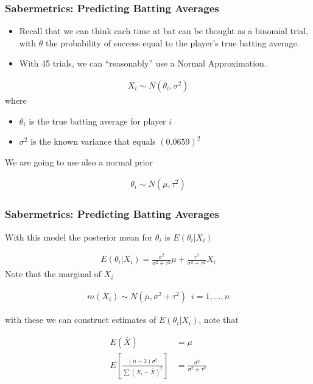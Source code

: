 \documentclass[
  shownotes,
  xcolor={svgnames},
  hyperref={colorlinks,citecolor=DarkBlue,linkcolor=DarkRed,urlcolor=DarkBlue}
  ]{beamer}
\begin{document}
\begin{frame}[fragile]
\frametitle{Sabermetrics: Predicting Batting Averages}

\begin{itemize}
\item Recall that we can think each time at bat can be thought as a binomial trial, with $\theta$ the probability of success equal to the player's true batting average.
\item With 45 trials, we can ``reasonably'' use a Normal Approximation.
\end{itemize}

\begin{align}
  X_i \sim N(\theta_i,\sigma^2)
\end{align}
where

\begin{itemize}
  \item $\theta_i$ is the true batting average for player $i$
  \item $\sigma^2$ is the known variance that equals $(0.0659)^2$
\end{itemize}
We are going to use also a normal prior

\begin{align}
  \theta_i \sim N(\mu,\tau^2)
\end{align}

\end{frame}
\begin{frame}[fragile]
\frametitle{Sabermetrics: Predicting Batting Averages}
With this model the posterior mean for $\theta_i$ is $E(\theta_i|X_i)$

\begin{align}
E(\theta_i|X_i)=\frac{\sigma^2}{\sigma^2+\tau^2}\mu + \frac{\tau^2}{\sigma^2+\tau^2} X_i
\end{align}
Note that the marginal of $X_i$

\begin{align}
m(X_i)\sim N(\mu,\sigma^2+\tau^2)\,\,\,i=1,\dots,n
\end{align}

with these we can construct estimates of $E(\theta_i|X_i)$, note that

\begin{align}
E(\bar X)&=\mu \\
E\left[ \frac{(n-3)\sigma^2}{\sum(X_i-\bar X)^2}\right]&=\frac{\sigma^2}{\sigma^2+\tau^2}
\end{align}



\end{frame}
\end{document}
